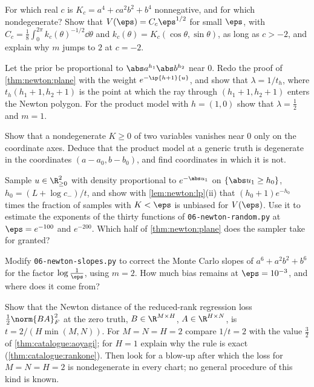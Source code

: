 \begin{refsection}
\begin{exercises}
\item \byhand For which real $c$ is $K_c=a^4+ca^2b^2+b^4$ nonnegative, and for which nondegenerate? Show that $V(\eps)=C_c\eps^{1/2}$ for small $\eps$, with $C_c=\frac18\int_0^{2\pi}k_c(\theta)^{-1/2}\dd\theta$ and $k_c(\theta)=K_c(\cos\theta,\sin\theta)$, as long as $c>-2$, and explain why $m$ jumps to $2$ at $c=-2$. 
\item \variation Let the prior be proportional to $\abs a^{h_1}\abs b^{h_2}$ near $0$. Redo the proof of \cref{thm:newton:plane} with the weight $e^{-\ip{h+1}{u}}$, and show that $\lambda=1/t_h$, where $t_h(h_1+1,h_2+1)$ is the point at which the ray through $(h_1+1,h_2+1)$ enters the Newton polygon. For the product model with $h=(1,0)$ show that $\lambda=\frac12$ and $m=1$.\label{ex:newton:prior}
\item \variation Show that a nondegenerate $K\ge0$ of two variables vanishes near $0$ only on the coordinate axes.  Deduce that the product model at a generic truth is degenerate in the coordinates $(a-a_0,b-b_0)$, and find coordinates in which it is not.\label{ex:newton:zeroset}
\item \measurement Sample $u\in\R^2_{\ge0}$ with density proportional to $e^{-\abs u_1}$ on $\{\abs u_1\ge h_0\}$, $h_0=(L+\log c_-)/t$, and show with \cref{lem:newton:lp}(ii) that $(h_0+1)e^{-h_0}$ times the fraction of samples with $K<\eps$ is unbiased for $V(\eps)$. Use it to estimate the exponents of the thirty functions of \texttt{06-newton-random.py} at $\eps=e^{-100}$ and $e^{-200}$. Which half of \cref{thm:newton:plane} does the sampler take for granted?
\item \measurement Modify \texttt{06-newton-slopes.py} to correct the Monte Carlo slopes of $a^6+a^2b^2+b^6$ for the factor $\log\frac1\eps$, using $m=2$. How much bias remains at $\eps=10^{-3}$, and where does it come from? \label{ex:newton:logcorrect}
\item \research Show that the Newton distance of the reduced-rank regression loss $\frac12\norm{BA}_F^2$ at the zero truth, $B\in\R^{M\times H}$, $A\in\R^{H\times N}$, is $t=2/(H\min(M,N))$. For $M=N=H=2$ compare $1/t=2$ with the value $\frac32$ of \cref{thm:catalogue:aoyagi}; for $H=1$ explain why the rule is exact (\cref{thm:catalogue:rankone}). Then look for a blow-up after which the loss for $M=N=H=2$ is nondegenerate in every chart; no general procedure of this kind is known.\label{ex:newton:research}
\end{exercises}


\end{refsection}
